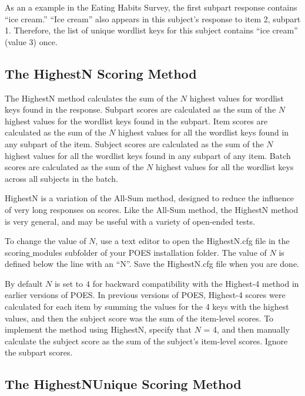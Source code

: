 \documentclass[11pt]{article}
\numberwithin{figure}{section}
\numberwithin{table}{section}
\begin{document}
As an a example in the Eating Habits Survey, the first subpart response contains ``ice cream.''  ``Ice cream'' also appears in this subject's response to item 2, subpart 1.  Therefore, the list of unique wordlist keys for this subject contains ``ice cream'' (value 3) once.



\subsection{The HighestN Scoring Method}

The HighestN method calculates the sum of the $N$ highest values for wordlist keys found in the response. Subpart scores are calculated as the sum of the $N$ highest values for the wordlist keys found in the subpart.  Item scores are calculated as the sum of the $N$ highest values for all the wordlist keys found in any subpart of the item.  Subject scores are calculated as the sum of the $N$ highest values for all the wordlist keys found in any subpart of any item.  Batch scores are calculated as the sum of the $N$ highest values for all the wordlist keys across all subjects in the batch.

HighestN is a variation of the All-Sum method, designed to reduce the influence of very long responses on scores.  Like the All-Sum method, the HighestN method is very general, and may be useful with a variety of open-ended tests.

To change the value of $N$, use a text editor to open the HighestN.cfg file in the scoring$\_$modules subfolder of your POES installation folder.  The value of $N$ is defined below the line with an ``N''.   Save the HighestN.cfg file when you are done.

By default $N$ is set to $4$ for backward compatibility with the Highest-4 method in earlier versions of POES.  In previous versions of POES, Highest-4 scores were calculated for each item by summing the values for the 4 keys with the highest values, and then the subject score was the sum of the  item-level scores.  To implement the method using HighestN, specify that $N$ = 4, and then manually calculate the subject score as the sum of the subject's item-level scores.  Ignore the subpart scores.



\subsection{The HighestNUnique Scoring Method}
\end{document}
